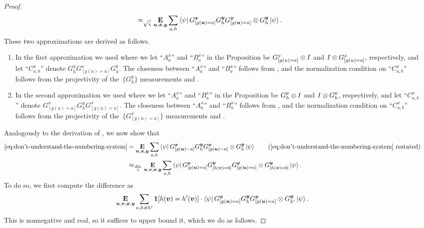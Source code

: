 \begin{proof}
\begin{align}
&\approx_{\sqrt{\zeta}} \mathop{\bf E\/}_{\boldsymbol{u},{\boldsymbol{x}},\boldsymbol{y}} \sum_{a,h} \bra{\psi} G^{{\boldsymbol{x}}}_{[g(\boldsymbol{u}) = a]} G^{\boldsymbol{y}}_h G^{{\boldsymbol{x}}}_{[g(\boldsymbol{u}) = a]} \otimes G^{\boldsymbol{y}}_h \ket{\psi}.\label{eq:don't-understand-the-numbering-system}
\end{align}
These two approximations are derived as follows.
\begin{enumerate}
\item
In the first approximation we used  where we let ``$A^x_a$'' and ``$B^x_a$'' in the Proposition be $G^x_{[g(u)=a]} \otimes I$ and $I \otimes G^x_{[g(u) = a]}$, respectively, and let ``$C^x_{a,b}$'' denote $G^y_h G^x_{[g(u)=a]} G^y_h$. The closeness between ``$A^x_a$'' and ``$B^x_a$'' follows from , and the normalization condition on ``$C^x_{a,b}$'' follows from the projectivity of the~$\{G^y_h\}$ measurements and .
\item
In the second approximation we used  where we let ``$A^x_a$'' and ``$B^x_a$'' in the Proposition be $G^y_h \otimes I$ and $I \otimes G^y_h$, respectively, and let ``$C^x_{a,b}$'' denote $G^x_{[g(u)=a]} G^y_h G^x_{[g(u)=a]}$. The closeness between ``$A^x_a$'' and ``$B^x_a$'' follows from , and the normalization condition on ``$C^x_{a,b}$'' follows from the projectivity of the~$\{G^x_{[g(u)=a]}\}$ measurements and .
\end{enumerate}
Analogously to the derivation of , we now show that
\begin{align}
\eqref{eq:don't-understand-the-numbering-system}
& = \E_{\bu,\bx,\by} \sum_{a,h} \bra{\psi} G^{\bx}_{[g(\bu) = a]} G^{\by}_h G^{\bx}_{[g(\bu) = a]} \ot G^{\by}_h \ket{\psi} \tag{\Cref{eq:don't-understand-the-numbering-system} restated}\\
& \approx_{\frac{dm}{q}} \E_{\bu,\bv,\bx,\by} \sum_{a,b} \bra{\psi} G^{\bx}_{[g(\bu) = a]} G^{\by}_{[h(\bv)=b]} G^{\bx}_{[g(\bu) = a]} \ot G^{\by}_{[h(\bv)=b]} \ket{\psi}.\label{eq:evaluate-gcom-at-points-part-dos}
\end{align}
To do so, we first compute the difference as
\begin{equation}\label{eq:eq:don't-understand-the-numbering-system-diff}
\mathop{\bf E\/}_{\boldsymbol{u},\boldsymbol{v}, {\boldsymbol{x}},\boldsymbol{y}} \sum_{a,h\neq h'} \boldsymbol{1}[h(\boldsymbol{v}) = h'(\boldsymbol{v})] \cdot \bra{\psi} G^{{\boldsymbol{x}}}_{[g(\boldsymbol{u}) = a]} G^{\boldsymbol{y}}_h G^{{\boldsymbol{x}}}_{[g(\boldsymbol{u}) = a]} \otimes G^{\boldsymbol{y}}_{h'} \ket{\psi}.
\end{equation}
This is nonnegative and real, so it suffices to upper bound it, which we do as follows.

\end{proof}
